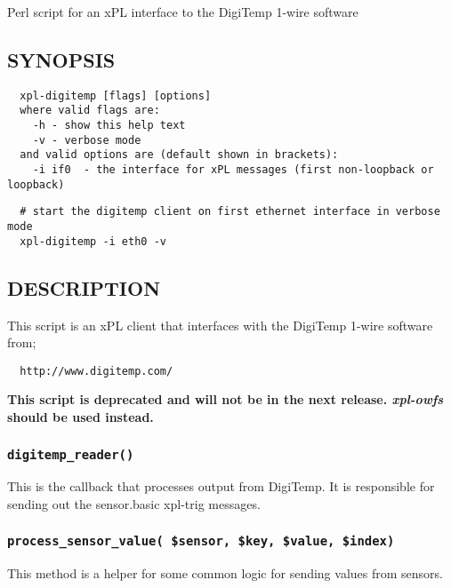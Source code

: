 \documentclass[12pt,a4paper]{article}
\begin{document}
Perl script for an xPL interface to the DigiTemp 1-wire software

\subsection*{SYNOPSIS\label{xpl-digitemp_SYNOPSIS}}
\begin{verbatim}
  xpl-digitemp [flags] [options]
  where valid flags are:
    -h - show this help text
    -v - verbose mode
  and valid options are (default shown in brackets):
    -i if0  - the interface for xPL messages (first non-loopback or loopback)
\end{verbatim}
\begin{verbatim}
  # start the digitemp client on first ethernet interface in verbose mode
  xpl-digitemp -i eth0 -v
\end{verbatim}
\subsection*{DESCRIPTION\label{xpl-digitemp_DESCRIPTION}}


This script is an xPL client that interfaces with the DigiTemp 1-wire
software from;

\begin{verbatim}
  http://www.digitemp.com/
\end{verbatim}


\textbf{This script is deprecated and will not be in the next release.
\emph{xpl-owfs} should be used instead.}

\subsubsection*{\texttt{digitemp\_reader()}\label{xpl-digitemp_digitemp_reader_}}


This is the callback that processes output from DigiTemp.  It is
responsible for sending out the sensor.basic xpl-trig messages.

\subsubsection*{\texttt{process\_sensor\_value( \$sensor, \$key, \$value, \$index)}\label{xpl-digitemp_process_sensor_value_sensor_key_value_index_}}


This method is a helper for some common logic for sending values
from sensors.
\end{document}
